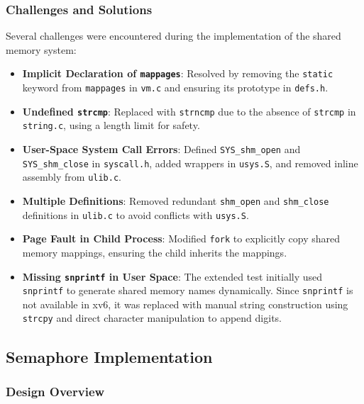 \documentclass[12pt]{article}
\begin{document}
\subsubsection{Challenges and Solutions}
\label{subsubsec:shared-memory-challenges}

Several challenges were encountered during the implementation of the shared memory system:
\begin{itemize}
  \item \textbf{Implicit Declaration of \texttt{mappages}}: Resolved by removing the \texttt{static} keyword from \texttt{mappages} in \texttt{vm.c} and ensuring its prototype in \texttt{defs.h}.
  \item \textbf{Undefined \texttt{strcmp}}: Replaced with \texttt{strncmp} due to the absence of \texttt{strcmp} in \texttt{string.c}, using a length limit for safety.
  \item \textbf{User-Space System Call Errors}: Defined \texttt{SYS\_shm\_open} and \texttt{SYS\_shm\_close} in \texttt{syscall.h}, added wrappers in \texttt{usys.S}, and removed inline assembly from \texttt{ulib.c}.
  \item \textbf{Multiple Definitions}: Removed redundant \texttt{shm\_open} and \texttt{shm\_close} definitions in \texttt{ulib.c} to avoid conflicts with \texttt{usys.S}.
  \item \textbf{Page Fault in Child Process}: Modified \texttt{fork} to explicitly copy shared memory mappings, ensuring the child inherits the mappings.
  \item \textbf{Missing \texttt{snprintf} in User Space}: The extended test initially used \texttt{snprintf} to generate shared memory names dynamically. Since \texttt{snprintf} is not available in xv6, it was replaced with manual string construction using \texttt{strcpy} and direct character manipulation to append digits.
\end{itemize}

\subsection{Semaphore Implementation}
\label{subsec:semaphore-implementation}

\subsubsection{Design Overview}
\label{subsubsec:semaphore-design}
\end{document}
